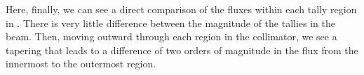 Here, finally, we can see a direct comparison of the fluxes within each tally region in .
There is very little difference between the magnitude of the tallies in the beam.
Then, moving outward through each region in the collimator, we see a tapering that leads to a difference of two orders of magnitude in the flux from the innermost to the outermost region.


